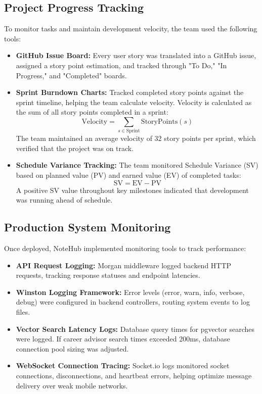 \documentclass[12,Times new Roman,a4paper]{report}
\begin{document}
\subsection{Project Progress Tracking}
To monitor tasks and maintain development velocity, the team used the following tools:
\begin{itemize}
    \item \textbf{GitHub Issue Board:} Every user story was translated into a GitHub issue, assigned a story point estimation, and tracked through "To Do," "In Progress," and "Completed" boards.
    \item \textbf{Sprint Burndown Charts:} Tracked completed story points against the sprint timeline, helping the team calculate velocity. Velocity is calculated as the sum of all story points completed in a sprint:
    \begin{equation}
    \text{Velocity} = \sum_{s \in \text{Sprint}} \text{StoryPoints}(s)
    \end{equation}
    The team maintained an average velocity of 32 story points per sprint, which verified that the project was on track.
    \item \textbf{Schedule Variance Tracking:} The team monitored Schedule Variance (SV) based on planned value (PV) and earned value (EV) of completed tasks:
    \begin{equation}
    \text{SV} = \text{EV} - \text{PV}
    \end{equation}
    A positive SV value throughout key milestones indicated that development was running ahead of schedule.
\end{itemize}

\subsection{Production System Monitoring}
Once deployed, NoteHub implemented monitoring tools to track performance:
\begin{itemize}
    \item \textbf{API Request Logging:} Morgan middleware logged backend HTTP requests, tracking response statuses and endpoint latencies.
    \item \textbf{Winston Logging Framework:} Error levels (error, warn, info, verbose, debug) were configured in backend controllers, routing system events to log files.
    \item \textbf{Vector Search Latency Logs:} Database query times for pgvector searches were logged. If career advisor search times exceeded 200ms, database connection pool sizing was adjusted.
    \item \textbf{WebSocket Connection Tracing:} Socket.io logs monitored socket connections, disconnections, and heartbeat errors, helping optimize message delivery over weak mobile networks.
\end{itemize}
\end{document}
